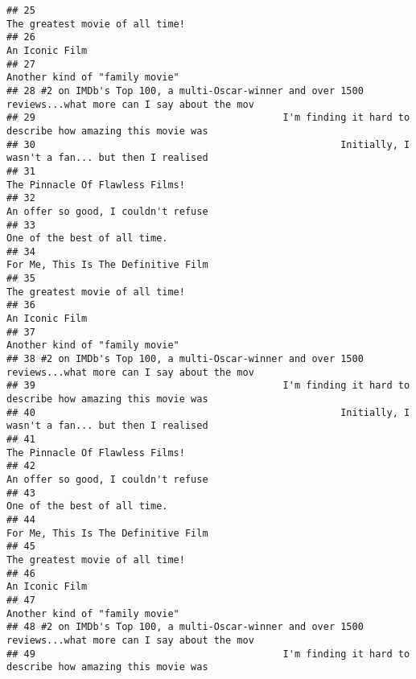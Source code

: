 \documentclass[
]{article}
\begin{document}
\begin{verbatim}
## 25                                                                      The greatest movie of all time!
## 26                                                                                       An Iconic Film
## 27                                                                       Another kind of "family movie"
## 28 #2 on IMDb's Top 100, a multi-Oscar-winner and over 1500 reviews...what more can I say about the mov
## 29                                           I'm finding it hard to describe how amazing this movie was
## 30                                                     Initially, I wasn't a fan... but then I realised
## 31                                                                      The Pinnacle Of Flawless Films!
## 32                                                                  An offer so good, I couldn't refuse
## 33                                                                         One of the best of all time.
## 34                                                                  For Me, This Is The Definitive Film
## 35                                                                      The greatest movie of all time!
## 36                                                                                       An Iconic Film
## 37                                                                       Another kind of "family movie"
## 38 #2 on IMDb's Top 100, a multi-Oscar-winner and over 1500 reviews...what more can I say about the mov
## 39                                           I'm finding it hard to describe how amazing this movie was
## 40                                                     Initially, I wasn't a fan... but then I realised
## 41                                                                      The Pinnacle Of Flawless Films!
## 42                                                                  An offer so good, I couldn't refuse
## 43                                                                         One of the best of all time.
## 44                                                                  For Me, This Is The Definitive Film
## 45                                                                      The greatest movie of all time!
## 46                                                                                       An Iconic Film
## 47                                                                       Another kind of "family movie"
## 48 #2 on IMDb's Top 100, a multi-Oscar-winner and over 1500 reviews...what more can I say about the mov
## 49                                           I'm finding it hard to describe how amazing this movie was

\end{verbatim}
\end{document}
